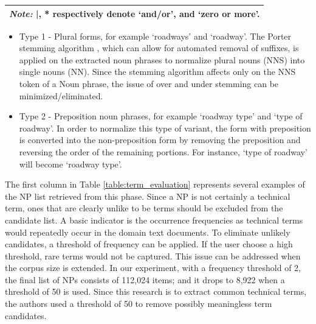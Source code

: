\documentclass[Journal,InsideFigs, DoubleSpace]{ascelike} %
\begin{document}
\begin{enumerate} [label=\roman*]
\begin{table} [t]
\begin{tabular}{l l}
			\hline
			\multicolumn{2}{l}{\textit{Note:} |, * respectively denote `and/or', and `zero or more'.  } \\
			\hline
		\end{tabular}
		\normalsize
\end{table}
\begin{itemize}
		\item Type 1 - Plural forms, for example `roadways' and `roadway'. The Porter stemming algorithm \cite{porter80}, which can allow for automated removal of suffixes, is applied on the extracted noun phrases to normalize plural nouns (NNS) into single nouns (NN). Since the stemming algorithm affects only on the NNS token of a Noun phrase, the issue of over and under stemming can be minimized/eliminated. %
		\item Type 2 - Preposition noun phrases, for example `roadway type' and `type of roadway'. In order to normalize this type of variant, the form with preposition is converted into the non-preposition form by removing the preposition and reversing the order of the remaining portions. For instance, `type of roadway' will become `roadway type'.
\end{itemize}
The first column in Table \ref{table:term_evaluation} represents several examples of the NP list retrieved from this phase. Since a NP is not certainly a technical term, ones that are clearly unlike to be terms should be excluded from the candidate list. A basic indicator is the occurrence frequencies as technical terms would repeatedly occur in the domain text documents. To eliminate unlikely candidates, a threshold of frequency can be applied. If the user choose a high threshold, rare terms would not be captured. This issue can be addressed when the corpus size is extended. In our experiment, with a frequency threshold of 2, the final list of NPs consists of 112,024 items; and it drops to 8,922 when a threshold of 50 is used. Since this research is to extract common technical terms, the authors used a threshold of 50 to remove possibly meaningless term candidates. 
\end{enumerate}
	
\end{document}
